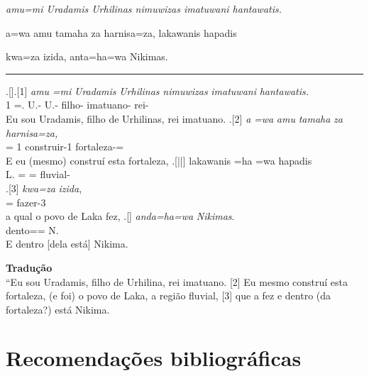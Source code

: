 \documentclass[article]{lúvio}
\begin{document}
\setcounter{parcount}{0}
\begin{parnumbersa}[]

	\raggedright%
	\itshape%
	amu=mi Uradamis Urhilinas nimuwizas imatuwani hantawatis.

	a=wa amu tamaha za harnisa=za, lakawanis hapadis

	kwa=za izida, anta=ha=wa Nikimas.


\end{parnumbersa}

\vspace{10pt}
\hrule
\vspace{20pt}


\clearpage%

\ex.[]\ag.[1] \emph{amu} \emph{=mi} \emph{Uradamis} \emph{Urhilinas}
\emph{nimuwizas} \emph{imatuwani} \emph{hantawatis.}\\
\Pro{}1\Sg{} =\Refl{}. U.-\Com{}\Nom{}\Sg{} U.-\Com{}\Gen{}\Sg{} filho-\Com{}\Nom{}\Sg{}
imatuano-\Com{}\Nom{}\Sg{} rei-\Com{}\Nom{}\Sg{}\\
Eu sou Uradamis, filho de Urhilinas, rei imatuano.
\bg.[2] \emph{a} \emph{=wa} \emph{amu} \emph{tamaha} \emph{za} \emph{harnisa=za,}\\
\Conj{} =\Clt{} \Pro{}1\Sg{} construir-1\Sg{}\Pret{} \Pro{}\Neut{}\Acu{}\Sg{}
fortaleza-\Neut{}\Acu{}\Sg{}=\Clt{}\\
E eu (mesmo) construí esta fortaleza,
\bg.[||] lakawanis =ha =wa hapadis\\
L.\Com{}\Nom{}\Sg{} =\Conj{} =\Clt{} fluvial-\Com{}\Nom{}\Sg{}\\
\bg.[3] \emph{kwa=za} \emph{izida},\\
\Rel{}\Neut{}\Acu{}\Sg{}=\Clt{} fazer-3\Sg{}\Pret{}\\
a qual o povo de Laka fez,
\bg.[] \emph{anda=ha=wa} \emph{Nikimas}.\\
dento=\Conj{}=\Clt{} N.\Com{}\Nom{}\Sg{}\\
E dentro [dela está] Nikima.


\bigskip
\begin{flushleft}
	\noindent \textbf{Tradução}\\
	\noindent [1] ``Eu sou Uradamis, filho de Urhilina, rei imatuano. [2] Eu mesmo
	construí esta fortaleza, (e foi) o povo de Laka, a região fluvial, [3] que a fez e
	dentro (da fortaleza?) está Nikima.
\end{flushleft}


\chapter*{Recomendações bibliográficas}
\end{document}
